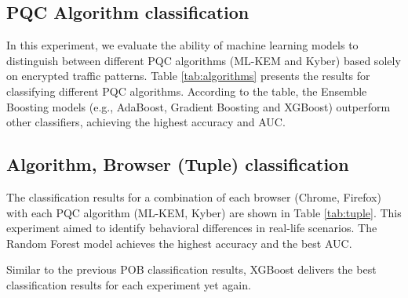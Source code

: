 \documentclass[10pt,journal]{IEEEtran}%
\begin{document}
\subsection{PQC Algorithm classification}
In this experiment, we evaluate the ability of machine learning models to distinguish between different PQC algorithms (ML-KEM and Kyber) based solely on encrypted traffic patterns. Table \ref{tab:algorithms} presents the results for classifying different PQC algorithms. According to the table, the Ensemble Boosting models (e.g., AdaBoost, Gradient Boosting and XGBoost) outperform other classifiers, achieving the highest accuracy and AUC.


\subsection{Algorithm, Browser (Tuple) classification}
The classification results for a combination of each browser (Chrome, Firefox) with each PQC algorithm (ML-KEM, Kyber) are shown in Table \ref{tab:tuple}. This experiment aimed to identify behavioral differences in real-life scenarios. The Random Forest model achieves the highest accuracy and the best AUC.  


Similar to the previous POB classification results, XGBoost delivers the best classification results for each experiment yet again.
\end{document}
